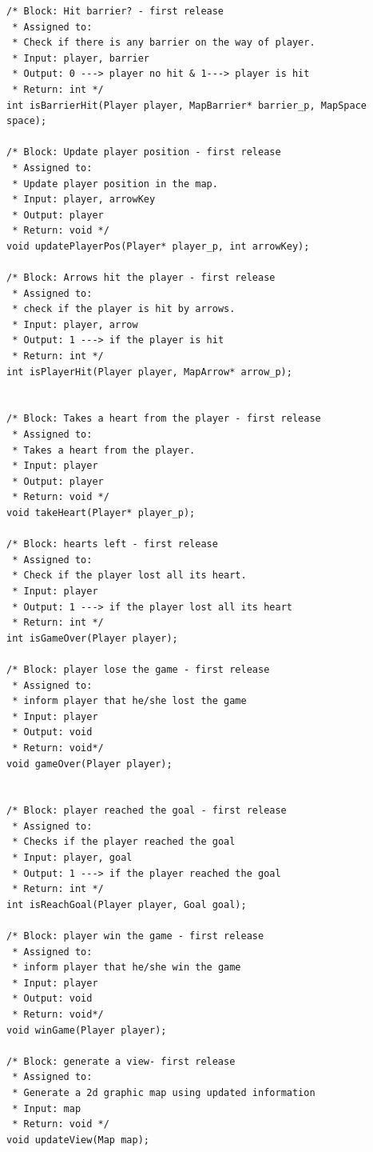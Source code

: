 \begin{verbatim}
/* Block: Hit barrier? - first release
 * Assigned to:
 * Check if there is any barrier on the way of player.
 * Input: player, barrier
 * Output: 0 ---> player no hit & 1---> player is hit
 * Return: int */
int isBarrierHit(Player player, MapBarrier* barrier_p, MapSpace space);

/* Block: Update player position - first release
 * Assigned to:
 * Update player position in the map.
 * Input: player, arrowKey
 * Output: player 
 * Return: void */
void updatePlayerPos(Player* player_p, int arrowKey);

/* Block: Arrows hit the player - first release
 * Assigned to:
 * check if the player is hit by arrows.
 * Input: player, arrow
 * Output: 1 ---> if the player is hit
 * Return: int */
int isPlayerHit(Player player, MapArrow* arrow_p);


/* Block: Takes a heart from the player - first release
 * Assigned to:
 * Takes a heart from the player.
 * Input: player
 * Output: player
 * Return: void */
void takeHeart(Player* player_p);

/* Block: hearts left - first release
 * Assigned to:
 * Check if the player lost all its heart.
 * Input: player
 * Output: 1 ---> if the player lost all its heart
 * Return: int */
int isGameOver(Player player);

/* Block: player lose the game - first release
 * Assigned to:
 * inform player that he/she lost the game
 * Input: player
 * Output: void
 * Return: void*/
void gameOver(Player player);


/* Block: player reached the goal - first release
 * Assigned to:
 * Checks if the player reached the goal
 * Input: player, goal
 * Output: 1 ---> if the player reached the goal
 * Return: int */
int isReachGoal(Player player, Goal goal);

/* Block: player win the game - first release
 * Assigned to:
 * inform player that he/she win the game
 * Input: player
 * Output: void
 * Return: void*/
void winGame(Player player);

/* Block: generate a view- first release
 * Assigned to:
 * Generate a 2d graphic map using updated information
 * Input: map
 * Return: void */
void updateView(Map map);

\end{verbatim}